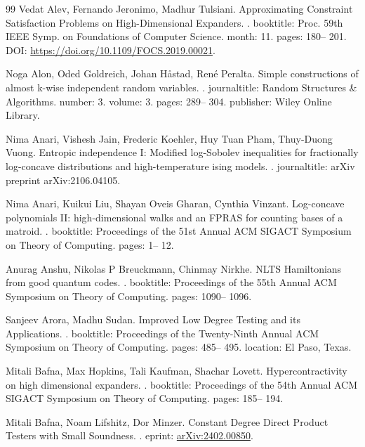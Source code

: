 \documentclass[10pt,a4paper]{article}
\theoremstyle{definition}
\theoremstyle{remark}
\numberwithin{equation}{section}
\begin{document}
\begin{thebibliography}{99}
Vedat Alev, Fernando Jeronimo, Madhur Tulsiani.
\newblock Approximating Constraint Satisfaction Problems on High-Dimensional Expanders.
.
\newblock booktitle: Proc. 59th IEEE Symp. on Foundations of Computer Science.
\newblock month: 11.
\newblock pages: 180-- 201.
\newblock DOI: \url{https://doi.org/10.1109/FOCS.2019.00021}.

Noga Alon, Oded Goldreich, Johan H{å}stad, René Peralta.
\newblock Simple constructions of almost k-wise independent random variables.
.
\newblock journaltitle: Random Structures \& Algorithms.
\newblock number: 3.
\newblock volume: 3.
\newblock pages: 289-- 304.
\newblock publisher: Wiley Online Library.

Nima Anari, Vishesh Jain, Frederic Koehler, Huy Tuan Pham, Thuy-Duong Vuong.
\newblock Entropic independence I: Modified log-Sobolev inequalities for fractionally log-concave distributions and high-temperature ising models.
.
\newblock journaltitle: arXiv preprint arXiv:2106.04105.

Nima Anari, Kuikui Liu, Shayan Oveis Gharan, Cynthia Vinzant.
\newblock Log-concave polynomials II: high-dimensional walks and an FPRAS for counting bases of a matroid.
.
\newblock booktitle: Proceedings of the 51st Annual ACM SIGACT Symposium on Theory of Computing.
\newblock pages: 1-- 12.

Anurag Anshu, Nikolas P Breuckmann, Chinmay Nirkhe.
\newblock NLTS Hamiltonians from good quantum codes.
.
\newblock booktitle: Proceedings of the 55th Annual ACM Symposium on Theory of Computing.
\newblock pages: 1090-- 1096.

Sanjeev Arora, Madhu Sudan.
\newblock Improved Low Degree Testing and its Applications.
.
\newblock booktitle: Proceedings of the Twenty-Ninth Annual {ACM} Symposium on Theory of Computing.
\newblock pages: 485-- 495.
\newblock location: El Paso, Texas.

Mitali Bafna, Max Hopkins, Tali Kaufman, Shachar Lovett.
\newblock Hypercontractivity on high dimensional expanders.
.
\newblock booktitle: Proceedings of the 54th Annual ACM SIGACT Symposium on Theory of Computing.
\newblock pages: 185-- 194.

Mitali Bafna, Noam Lifshitz, Dor Minzer.
\newblock Constant Degree Direct Product Testers with Small Soundness.
.
\newblock eprint: \url{arXiv:2402.00850}.


\end{thebibliography}
\end{document}
